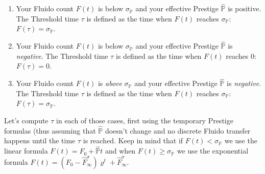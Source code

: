 \documentclass[a4paper,12pt]{scrartcl}
\newcounter{formula}
\begin{document}
\begin{enumerate}
 \item Your Fluido count $F(t)$ is below $\sigma_{\mathbb{P}}$ and your effective Prestige $\hat{\mathbb{P}}$ is positive. The Threshold time $\tau$ is defined as the time when $F(t)$ reaches $\sigma_{\mathbb{P}}$: $F(\tau) = \sigma_{\mathbb{P}}$.
 \item Your Fluido count $F(t)$ is below $\sigma_{\mathbb{P}}$ and your effective Prestige $\hat{\mathbb{P}}$ is \textit{negative}. The Threshold time $\tau$ is defined as the time when $F(t)$ reaches $0$: $F(\tau) = 0$.
 \item Your Fluido count $F(t)$ is \textit{above} $\sigma_{\mathbb{P}}$ and your effective Prestige $\hat{\mathbb{P}}$ is \textit{negative}. The Threshold time $\tau$ is defined as the time when $F(t)$ reaches $\sigma_{\mathbb{P}}$: $F(\tau) = \sigma_{\mathbb{P}}$.
\end{enumerate}
Let's compute $\tau$ in each of those cases, first using the temporary Prestige formulas (thus assuming that $\hat{\mathbb{P}}$ doesn't change and no discrete Fluido transfer happens until the time $\tau$ is reached. Keep in mind that if $F(t) < \sigma_{\mathbb{P}}$ we use the linear formula $F(t)=F_0 + \hat{\mathbb{P}}t$ and when $F(t) \geq \sigma_{\mathbb{P}}$ we use the exponential formula $F(t)=(F_0-\hat{F}^{\sigma}_{\infty}) \varrho^t + \hat{F}^{\sigma}_{\infty}$.
\end{document}

